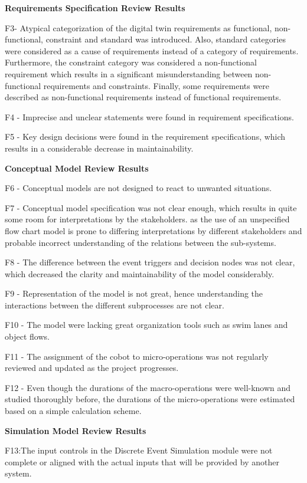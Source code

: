 \documentclass{llncs}
\begin{document}
\textbf{Requirements Specification Review Results}

F3-  Atypical categorization of the digital twin requirements as functional, non-functional, constraint and standard was introduced. 
Also, standard categories were considered as a cause of requirements instead of a category of requirements. Furthermore, 
the constraint category was considered a non-functional requirement which results in a significant misunderstanding between non-functional 
requirements and constraints. Finally, some requirements were described as non-functional requirements instead of functional requirements. 

F4 - Imprecise and unclear statements were found in requirement specifications. 

F5 - Key design decisions were found in the requirement specifications, which results in a considerable decrease in maintainability. 

\textbf{Conceptual  Model Review Results}

F6 - Conceptual models are not designed to react to unwanted situations. 

F7 - Conceptual model specification was not clear enough, which results in quite some room for interpretations by the stakeholders. 
as the use of an unspecified flow chart model is prone to differing interpretations by different stakeholders and probable incorrect understanding of the relations between the sub-systems.

F8 - The difference between the event triggers and decision nodes was not clear, which decreased the clarity and maintainability of the model considerably. 

F9 - Representation of the model is not great, hence understanding the interactions between the different subprocesses are not clear.

F10 - The model were lacking great organization tools such as swim lanes and object flows. 

F11 - The assignment of the cobot to micro-operations was not regularly reviewed and updated as the project progresses. 

F12 - Even though the durations of the macro-operations were well-known and studied thoroughly before, the durations of the micro-operations were estimated based on a simple calculation scheme.

\textbf{Simulation Model Review Results}

F13:The input controls in the Discrete  Event Simulation module were not complete or aligned with the actual inputs that will be provided by another system. 
\end{document}
